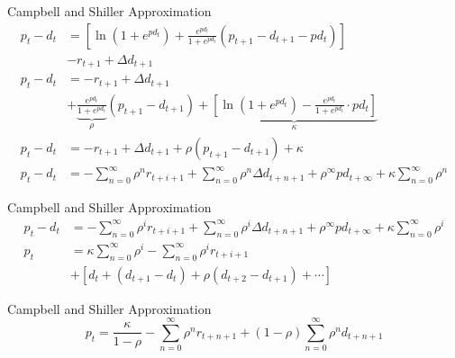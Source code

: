 \documentclass[UTF8, 16pt]{beamer}
\begin{document}
\begin{CJK*}{UTF8}{gbsn}
\begin{frame}{Campbell and Shiller Approximation}
	$$
	\begin{aligned}
		p_t-d_t&=\left[ \ln \left( 1+e^{pd_t} \right) +\frac{e^{pd_t}}{1+e^{pd_t}}\left( p_{t+1}-d_{t+1}-pd_t \right) \right] 
		\\&-r_{t+1}+\varDelta d_{t+1}
		\\p_t-d_t&=-r_{t+1}+\varDelta d_{t+1}
		\\&+\underbrace{\frac{e^{pd_t}}{1+e^{pd_t}}}_{\rho}\left( p_{t+1}-d_{t+1} \right) +
		\underbrace{\left[ \ln \left( 1+e^{pd_t} \right) -\frac{e^{pd_t}}{1+e^{pd_t}}\cdot pd_t \right]}_{\kappa}
		\\p_t-d_t&=-r_{t+1}+\varDelta d_{t+1}+\rho \left( p_{t+1}-d_{t+1} \right) +\kappa
		\\p_t-d_t&=-\sum_{n=0}^{\infty}{\rho ^nr_{t+i+1}}+\sum_{n=0}^{\infty}{\rho ^n\varDelta d_{t+n+1}}+\rho ^{\infty}pd_{t+\infty}+\kappa \sum_{n=0}^{\infty}{\rho ^n}
	\end{aligned}
	$$
\end{frame}

\begin{frame}{Campbell and Shiller Approximation}
	$$
	\begin{aligned}
		p_t-d_t&=-\sum_{n=0}^{\infty}{\rho ^ir_{t+i+1}}+\sum_{n=0}^{\infty}{\rho ^i\varDelta d_{t+n+1}}+\rho ^{\infty}pd_{t+\infty}+\kappa \sum_{n=0}^{\infty}{\rho ^i}
		\\
		p_t&=\kappa \sum_{n=0}^{\infty}{\rho ^i}-\sum_{n=0}^{\infty}{\rho ^ir_{t+i+1}}
		\\&+\left[ d_t+\left( d_{t+1}-d_t \right) +\rho \left( d_{t+2}-d_{t+1} \right) +\cdots \right]
	\end{aligned}
	$$
	\begin{alertblock}{Campbell and Shiller Approximation}
		$$
		p_t=\frac{\kappa}{1-\rho}-\sum_{n=0}^{\infty}{\rho ^n r_{t+n+1}}+\left( 1-\rho \right) \sum_{n=0}^{\infty}{\rho^n d_{t+n+1}}
		$$
	\end{alertblock}
\end{frame}


\end{CJK*}
\end{document}
